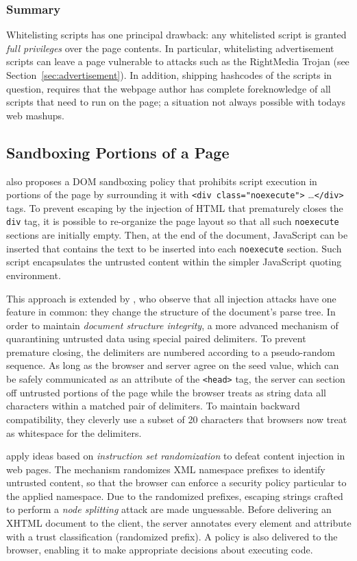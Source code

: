 \documentclass{acmtrans2m}
\begin{document}
\subsubsection*{Summary}
Whitelisting scripts has one principal drawback: any whitelisted script is granted \emph{full privileges} over the page contents.
In particular, whitelisting advertisement scripts can leave a page vulnerable to attacks such as the RightMedia Trojan (see Section~\ref{sec:advertisement}).
In addition, shipping hashcodes of the scripts in question, requires that the webpage author has complete foreknowledge of all scripts that need to run on the page; a situation not always possible with todays web mashups.

\subsection{Sandboxing Portions of a Page}

 also proposes a DOM sandboxing policy that prohibits script execution in portions of the page by surrounding it with \texttt{<div class="noexecute">} \ldots \texttt{</div>} tags.
To prevent escaping by the injection of HTML that prematurely closes the \texttt{div} tag, it is possible to re-organize the page layout so that all such \texttt{noexecute} sections are initially empty.
Then, at the end of the document, JavaScript can be inserted that contains the text to be inserted into each \texttt{noexecute} section.
Such script encapsulates the untrusted content within the simpler JavaScript quoting environment.

This approach is extended by , who observe that all injection attacks have one feature in common: they change the structure of the document's parse tree.
In order to maintain \emph{document structure integrity}, a more advanced mechanism of quarantining untrusted data using special paired delimiters.
To prevent premature closing, the delimiters are numbered according to a pseudo-random sequence.
As long as the browser and server agree on the seed value, which can be safely communicated as an attribute of the \texttt{<head>} tag, the server can section off untrusted portions of the page while the browser treats as string data all characters within a matched pair of delimiters.
To maintain backward compatibility, they cleverly use a subset of 20 characters that browsers now treat as whitespace for the delimiters.

 apply ideas based on \emph{instruction set randomization} to defeat content injection in web pages.
The mechanism randomizes XML namespace prefixes to identify untrusted content, so that the browser can enforce a security policy particular to the applied namespace.
Due to the randomized prefixes, escaping strings crafted to perform a \emph{node splitting} attack are made unguessable.
Before delivering an XHTML document to the client, the server annotates every element and attribute with a trust classification (randomized prefix).
A policy is also delivered to the browser, enabling it to make appropriate decisions about executing code.
\end{document}
